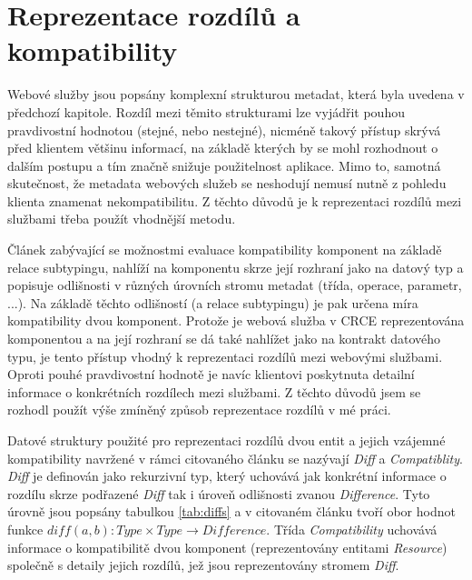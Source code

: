 \documentclass[czech,DP]{thesiskiv}
\begin{document}
\section{Reprezentace rozdílů a kompatibility}
\label{sec:diff-info}
Webové služby jsou popsány komplexní strukturou metadat, která byla uvedena v předchozí kapitole. Rozdíl mezi těmito strukturami lze vyjádřit pouhou pravdivostní hodnotou (stejné, nebo nestejné), nicméně takový přístup skrývá před klientem většinu informací, na základě kterých by se mohl rozhodnout o dalším postupu a tím značně snižuje použitelnost aplikace. Mimo to, samotná skutečnost, že metadata webových služeb se neshodují nemusí nutně z pohledu klienta znamenat nekompatibilitu. Z těchto důvodů je k reprezentaci rozdílů mezi službami třeba použít vhodnější metodu.

Článek \cite{brada2006diff} zabývající se možnostmi evaluace kompatibility komponent na základě relace subtypingu, nahlíží na komponentu skrze její rozhraní jako na datový typ a popisuje odlišnosti v různých úrovních stromu metadat (třída, operace, parametr, ...). Na základě těchto odlišností (a relace subtypingu) je pak určena míra kompatibility dvou komponent. Protože je webová služba v CRCE reprezentována komponentou a na její rozhraní se dá také nahlížet jako na kontrakt datového typu, je tento přístup vhodný k reprezentaci rozdílů mezi webovými službami. Oproti pouhé pravdivostní hodnotě je navíc klientovi poskytnuta detailní informace o konkrétních rozdílech mezi službami. Z těchto důvodů jsem se rozhodl použít výše zmíněný způsob reprezentace rozdílů v mé práci. 

Datové struktury použité pro reprezentaci rozdílů dvou entit a jejich vzájemné kompatibility navržené v rámci citovaného článku se nazývají \textit{Diff} a \textit{Compatiblity}. \textit{Diff} je definován jako rekurzivní typ, který uchovává jak konkrétní informace o rozdílu skrze podřazené \textit{Diff} tak i úroveň odlišnosti zvanou \textit{Difference}. Tyto úrovně jsou popsány tabulkou \ref{tab:diffs} a v citovaném článku tvoří obor hodnot funkce $diff(a,b): Type \times Type \rightarrow Difference$. Třída \textit{Compatibility} uchovává informace o kompatibilitě dvou komponent (reprezentovány entitami \textit{Resource}) společně s detaily jejich rozdílů, jež jsou reprezentovány stromem \textit{Diff}.
\end{document}
